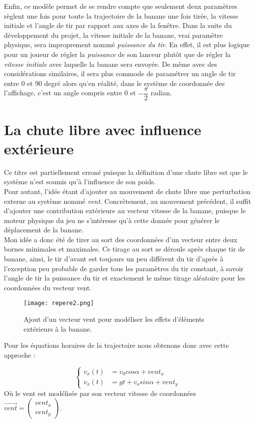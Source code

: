 \documentclass{tstextbook}
\begin{document}
Enfin, ce modèle permet de se rendre compte que seulement deux paramètres règlent une fois pour toute la trajectoire de la banane une fois tirée, la vitesse initiale et l'angle de tir par rapport aux axes de la fenêtre. Dans la suite du développement du projet, la vitesse initiale de la banane, vrai paramètre physique, sera improprement nommé \emph{puissance du tir}. En effet, il est plus logique pour un joueur de régler la \emph{puissance} de son lanceur plutôt que de régler la \emph{vitesse initiale} avec laquelle la banane sera envoyée. De même avec des considérations similaires, il sera plus commode de paramétrer un angle de tir entre 0 et 90 degré alors qu'en réalité, dans le système de coordonnée des l'affichage, c'est un angle compris entre 0 et $-\dfrac{\pi}{2}$ radian.

\section{La chute libre avec influence extérieure}

Ce titre est partiellement erroné puisque la définition d'une chute libre est que le système n'est soumis qu'à l'influence de son poids. \\
Pour autant, l'idée étant d'ajouter au mouvement de chute libre une perturbation externe au système nommé \emph{vent}. Concrètement, au mouvement précédent, il suffit d'ajouter une contribution extérieure au vecteur vitesse de la banane, puisque le moteur physique du jeu ne s'intéresse qu'à cette donnée pour générer le déplacement de la banane. \\

Mon idée a donc été de tirer au sort des coordonnées d'un vecteur entre deux bornes minimales et maximales. Ce tirage au sort se déroule après chaque tir de banane, ainsi, le tir d'avant est toujours un peu différent du tir d'après à l'exception peu probable de garder tous les paramètres du tir constant, à savoir l'angle de tir la puissance du tir et exactement le même tirage aléatoire pour les coordonnées du vecteur vent.


\begin{figure}[!h]
\centering
\texttt{[image: repere2.png]}
\caption{Ajout d'un vecteur vent pour modéliser les effets d'éléments extérieurs à la banane.}
\end{figure}


Pour les équations horaires de la trajectoire nous obtenons donc avec cette approche : 

$$
\left\{
    \begin{array}{ll}
   {v_x(t)} & = v_0 cos \alpha +vent_x\\
   {v_x(t)} & = gt+v_o sin \alpha +vent_y 
    \end{array}
\right.
$$
Où le vent est modélisée par son vecteur vitesse de coordonnées 	$\overrightarrow{vent} = \begin{pmatrix}
vent_x\\ vent_y
\end{pmatrix}$.
\end{document}
